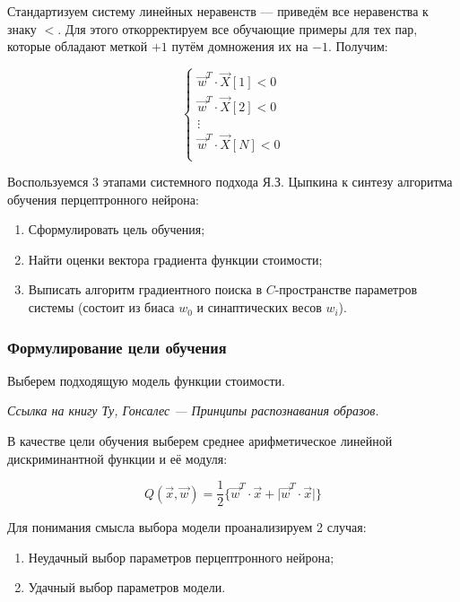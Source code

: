 \documentclass{article}
\numberwithin{equation}{subsection}
\begin{document}
Стандартизуем систему линейных неравенств --- приведём все неравенства к знаку $<$. 
Для этого откорректируем все обучающие примеры для тех пар, которые обладают меткой
$+1$ путём домножения их на $-1$. Получим:

\begin{equation}
    \begin{cases}
        \vec{w}^T \cdot \vec{X}[1] < 0 \\
        \vec{w}^T \cdot \vec{X}[2] < 0 \\
        \vdots \\
        \vec{w}^T \cdot \vec{X}[N] < 0 \\
    \end{cases}
    \label{eq:ineq_system}
\end{equation}

Воспользуемся 3 этапами системного подхода Я.З. Цыпкина к синтезу алгоритма обучения
перцептронного нейрона:
\begin{enumerate}
    \item Сформулировать цель обучения;
    \item Найти оценки вектора градиента функции стоимости;
    \item Выписать алгоритм градиентного поиска в $C$-пространстве параметров системы
    (состоит из биаса $w_0$ и синаптических весов $w_i$).
\end{enumerate}




\subsubsection{Формулирование цели обучения}

Выберем подходящую модель функции стоимости.

\begin{myquote}
    \textit{Ссылка на книгу Ту, Гонсалес --- Принципы распознавания образов.}
\end{myquote}

В качестве цели обучения выберем среднее арифметическое линейной дискриминантной 
функции и её модуля:

\begin{equation}
    Q(\vec{x}, \vec{w}) = \dfrac{1}{2} \{ \vec{w}^T \cdot \vec{x} + \lvert \vec{w}^T \cdot \vec{x}  \rvert \}
    \label{eq:weight_func_simple}
\end{equation}

Для понимания смысла выбора модели проанализируем 2 случая:
\begin{enumerate}
    \item Неудачный выбор параметров перцептронного нейрона;
    \item Удачный выбор параметров модели.
\end{enumerate}
\end{document}
